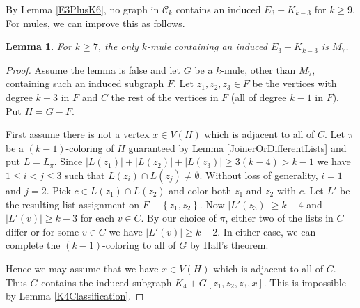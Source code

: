 \documentclass[12pt]{article}
\theoremstyle{plain}
\newtheorem{lem}[thm]{Lemma}
\theoremstyle{definition}
\theoremstyle{remark}
\newcommand{\fancy}[1]{\mathcal{#1}}
\newcommand{\C}[1]{\fancy{C}_{#1}}
\newcommand{\set}[1]{\left\{ #1 \right\}}
\newcommand{\card}[1]{\left|#1\right|}
\begin{document}
By Lemma \ref{E3PlusK6}, no graph in $\C{k}$ contains an induced $E_3 + K_{k - 3}$ for $k \geq 9$.  For mules, we can improve this as follows.
\begin{lem}\label{NoE3}
For $k \geq 7$, the only $k$-mule containing an induced $E_3 + K_{k - 3}$ is $M_7$.
\end{lem}
\begin{proof}
Assume the lemma is false and let $G$ be a $k$-mule, other than $M_7$, containing such an induced subgraph $F$.  Let $z_1, z_2, z_3 \in F$ be the vertices with degree $k-3$ in $F$ and $C$ the rest of the vertices in $F$ (all of degree $k-1$ in $F$). Put $H = G - F$.\newline

First assume there is not a vertex $x \in V(H)$ which is adjacent to all of $C$. Let $\pi$ be a $(k-1)$-coloring of $H$ guaranteed by Lemma \ref{JoinerOrDifferentLists} and put $L = L_\pi$.  Since $\card{L(z_1)} + \card{L(z_2)} + \card{L(z_3)} \geq 3(k-4) > k - 1$ we have $1 \leq i < j \leq 3$ such that $L(z_i) \cap L(z_j) \neq \emptyset$.  Without loss of generality, $i = 1$ and $j = 2$. Pick $c \in L(z_1) \cap L(z_2)$ and color both $z_1$ and $z_2$ with $c$.  Let $L'$ be the resulting list assignment on $F - \set{z_1, z_2}$.  Now $\card{L'(z_3)} \geq k-4$ and $\card{L'(v)} \geq k-3$ for each $v \in C$.  By our choice of $\pi$, either two of the lists in $C$ differ or for some $v \in C$ we have $\card{L'(v)} \geq k-2$.  In either case, we can complete the $(k-1)$-coloring to all of $G$ by Hall's theorem.\newline

Hence we may assume that we have $x \in V(H)$ which is adjacent to all of $C$.  Thus $G$ contains the induced subgraph $K_4 + G[z_1, z_2, z_3, x]$.  This is impossible by Lemma \ref{K4Classification}.
\end{proof}
\end{document}

